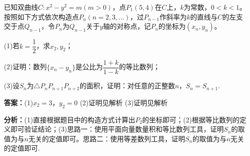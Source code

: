 \begin{question}[points=17]
已知双曲线$C:x^2-y^2=m(m>0)$，点$P_1(5,4)$在$C$上，$k$为常数，$0<k<1$。按照如下方式依次构造点$P_n(n=2,3,\ldots)$，过$P_{n-1}$作斜率为$k$的直线与$C$的左支交于点$Q_{n-1}$，令$P_n$为$Q_{n-1}$关于$y$轴的对称点，记$P_n$的坐标为$(x_n,y_n)$。

(1)若$k=\dfrac{1}{2}$，求$x_2,y_2$；

(2)证明：数列$\{x_n-y_n\}$是公比为$\dfrac{1+k}{1-k}$的等比数列；

(3)设$S_n$为$\triangle P_nP_{n+1}P_{n+2}$的面积，证明：对任意的正整数$n$，$S_n=S_{n+1}$.
\begin{solution}
\textbf{答案：}(1)$x_2=3$，$y_2=0$
(2)证明见解析
(3)证明见解析

\textbf{分析：}(1)直接根据题目中的构造方式计算出$P_2$的坐标即可；(2)根据等比数列的定义即可验证结论；(3)思路一：使用平面向量数量积和等比数列工具，证明$S_n$的取值为与$n$无关的定值即可。思路二：使用等差数列工具，证明$S_n$的取值为与$n$无关的定值即可.


\end{solution}
\end{question}
